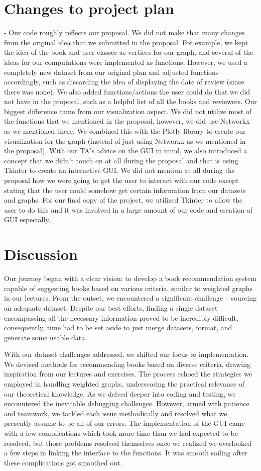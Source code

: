 \documentclass{article}
\begin{document}
\section{Changes to project plan}
- Our code roughly reflects our proposal. We did not make that many changes from the original idea that we submitted in the proposal. For example, we kept the idea of the book and user classes as vertices for our graph, and several of the ideas for our computations were implemented as functions. However, we used a completely new dataset from our original plan and adjusted functions accordingly, such as discarding the idea of displaying the date of review (since there was none). We also added functions/actions the user could do that we did not have in the proposal, such as a helpful list of all the books and reviewers. Our biggest difference came from our visualization aspect. We did not utilize most of the functions that we mentioned in the proposal, however, we did use Networkx as we mentioned there. We combined this with the Plotly library to create our visualization for the graph (instead of just using Networkx as we mentioned in the proposal). With our TA's advice on the GUI in mind, we also introduced a concept that we didn't touch on at all during the proposal and that is using Tkinter to create an interactive GUI. We did not mention at all during the proposal how we were going to get the user to interact with our code except stating that the user could somehow get certain information from our datasets and graphs. For our final copy of the project, we utilized Tkinter to allow the user to do this and it was involved in a large amount of our code and creation of GUI especially.

\section{Discussion}
Our journey began with a clear vision: to develop a book recommendation system capable of suggesting books based on various criteria, similar to weighted graphs in our lectures. From the outset, we encountered a significant challenge – sourcing an adequate dataset. Despite our best efforts, finding a single dataset encompassing all the necessary information proved to be incredibly difficult, consequently, time had to be set aside to just merge datasets, format, and generate some usable data.

With our dataset challenges addressed, we shifted our focus to implementation. We devised methods for recommending books based on diverse criteria, drawing inspiration from our lectures and exercises. The process echoed the strategies we employed in handling weighted graphs, underscoring the practical relevance of our theoretical knowledge. As we delved deeper into coding and testing, we encountered the inevitable debugging challenges. However, armed with patience and teamwork, we tackled each issue methodically and resolved what we presently assume to be all of our errors. The implementation of the GUI came with a few complications which took more time than we had expected to be resolved, but those problems resolved themselves once we realized we overlooked a few steps in linking the interface to the functions. It was smooth sailing after these complications got smoothed out.
\end{document}
